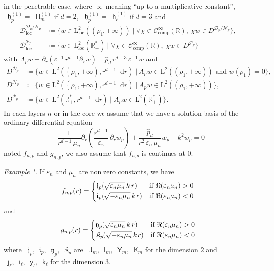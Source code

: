 \documentclass[12pt,a4paper]{article}
\theoremstyle{definition}
\theoremstyle{plain}
\theoremstyle{remark}
\newtheorem{example}[definition]{Example}
\newcommand{\bbR}{\mathbb{R}}
\newcommand{\calD}{\mathcal{D}}
\newcommand{\calN}{\mathcal{N}}
\newcommand{\calP}{\mathcal{P}}
\newcommand{\scrC}{\mathscr{C}}
\newcommand{\rmL}{\mathrm{L}}
\newcommand{\bJ}{\mathop{}\!\mathsf{J}}
\newcommand{\bY}{\mathop{}\!\mathsf{Y}}
\newcommand{\Hu}{\mathop{}\!\mathsf{H}^{(1)}}
\newcommand{\bI}{\mathop{}\!\mathsf{I}}
\newcommand{\bK}{\mathop{}\!\mathsf{K}}
\newcommand{\bj}{\mathop{}\!\mathsf{j}}
\newcommand{\by}{\mathop{}\!\mathsf{y}}
\newcommand{\hu}{\mathop{}\!\mathsf{h}^{(1)}}
\newcommand{\bi}{\mathop{}\!\mathsf{i}}
\newcommand{\bk}{\mathop{}\!\mathsf{k}}
\newcommand{\frj}{\mathop{}\!\mathfrak{j}}
\newcommand{\fry}{\mathop{}\!\mathfrak{y}}
\newcommand{\frh}{\mathop{}\!\mathfrak{h}^{(1)}}
\newcommand{\fri}{\mathop{}\!\mathfrak{i}}
\newcommand{\frk}{\mathop{}\!\mathfrak{K}}
\newcommand{\di}[1]{\mathop{}\!\mathrm{d}#1}
\newcommand{\plr}[1]{\left(#1\right)}
\newcommand{\eps}{\varepsilon}
\newcommand{\comp}{\mathrm{comp}}
\newcommand{\loc}{\mathrm{loc}}
\begin{document}
in the penetrable case, where $\propto$ meaning ``up to a multiplicative constant'', $\frh_p = \Hu_m$ if $d = 2$, $\frh_p = \hu_\ell$ if $d = 3$ and
\begin{align*}
    \calD^{\calD_p/\calN_p}_\loc & \coloneqq \{w \in \rmL_\loc^2((\rho_1, +\infty)) \mid \forall \chi \in \scrC_\comp^\infty(\bbR),\ \chi w \in D^{\calD_p/\calN_p}\}, \\
    \calD^{\calP_p}_\loc         & \coloneqq \{w \in \rmL_\loc^2(\bbR_+^*) \mid \forall \chi \in \scrC_\comp^\infty(\bbR),\ \chi w \in D^{\calP_p}\}
\end{align*}
with $A_p w =  \partial_r(\eps^{-1}\, r^{d-1} \partial_r w) - \widehat{p}_d\, r^{d-3}\, \eps^{-1}\, w$ and
\begin{align*}
    D^{\calD_p} & \coloneqq \{w \in \rmL^2((\rho_1, +\infty), r^{d-1}\di{r}) \mid A_p w \in \rmL^2((\rho_1, +\infty)) \text{ and } w(\rho_1) = 0\}, \\
    D^{\calN_p} & \coloneqq \{w \in \rmL^2((\rho_1, +\infty), r^{d-1}\di{r}) \mid A_p w \in \rmL^2((\rho_1, +\infty))\},                            \\
    D^{\calP_p} & \coloneqq \{w \in \rmL^2(\bbR_+^*, r^{d-1}\di{r}) \mid A_p w  \in \rmL^2(\bbR_+^*)\}.
\end{align*}
In each layers $n$ or in the core we assume that we have a solution basis of the ordinary differential equation
\[
    -\frac{1}{r^{d-1}\, \mu_n} \partial_r\plr{\frac{r^{d-1}}{\eps_n}\, \partial_r w_p} + \dfrac{\widehat{p}_d}{r^2\, \eps_n\, \mu_n} w_p - k^2 w_p = 0
\]
noted $f_{n, p}$ and $g_{n, p}$, we also assume that $f_{n, p}$ is continues at $0$.

\begin{example}
    If $\eps_n$ and $\mu_n$ are non zero constants, we have
    \[
        f_{n, p}(r) = \begin{dcases}
            \frj_p(\sqrt{\eps_n\mu_n}\, k\, r)  & \text{if } \Re(\eps_n\mu_n) > 0 \\
            \fri_p(\sqrt{-\eps_n\mu_n}\, k\, r) & \text{if } \Re(\eps_n\mu_n) < 0
        \end{dcases}
    \]
    and
    \[
        g_{n, p}(r) = \begin{dcases}
            \fry_p(\sqrt{\eps_n\mu_n}\, k\, r)  & \text{if } \Re(\eps_n\mu_n) > 0 \\
            \frk_p(\sqrt{-\eps_n\mu_n}\, k\, r) & \text{if } \Re(\eps_n\mu_n) < 0
        \end{dcases}
    \]
    where $\frj_p, \fri_p, \fry_p, \frk_p$ are $\bJ_m, \bI_m, \bY_m, \bK_m$ for the dimension $2$ and $\bj_\ell, \bi_\ell, \by_\ell, \bk_\ell$ for the dimension $3$.
\end{example}
\end{document}
